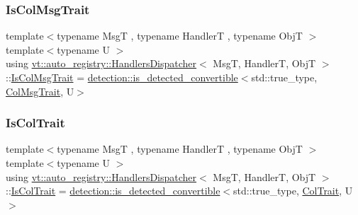 \mbox{\label{structvt_1_1auto__registry_1_1_handlers_dispatcher_a585421b015b2d94915817c509e38b073}} 
\subsubsection{\texorpdfstring{Is\+Col\+Msg\+Trait}{IsColMsgTrait}}
{\footnotesize\ttfamily template$<$typename MsgT , typename HandlerT , typename ObjT $>$ \\
template$<$typename U $>$ \\
using \hyperlink{structvt_1_1auto__registry_1_1_handlers_dispatcher}{vt\+::auto\+\_\+registry\+::\+Handlers\+Dispatcher}$<$ MsgT, HandlerT, ObjT $>$\+::\hyperlink{structvt_1_1auto__registry_1_1_handlers_dispatcher_a585421b015b2d94915817c509e38b073}{Is\+Col\+Msg\+Trait} =  \hyperlink{namespacedetection_afb970b23e39cfecb33449d40242c49ff}{detection\+::is\+\_\+detected\+\_\+convertible}$<$std\+::true\+\_\+type, \hyperlink{structvt_1_1auto__registry_1_1_handlers_dispatcher_aa2e8b80baa4dffdd9b2476ca9d2a7b46}{Col\+Msg\+Trait}, U$>$}

\mbox{\label{structvt_1_1auto__registry_1_1_handlers_dispatcher_aa5e51c30b4d5124a98d04bdc2be043ac}} 
\subsubsection{\texorpdfstring{Is\+Col\+Trait}{IsColTrait}}
{\footnotesize\ttfamily template$<$typename MsgT , typename HandlerT , typename ObjT $>$ \\
template$<$typename U $>$ \\
using \hyperlink{structvt_1_1auto__registry_1_1_handlers_dispatcher}{vt\+::auto\+\_\+registry\+::\+Handlers\+Dispatcher}$<$ MsgT, HandlerT, ObjT $>$\+::\hyperlink{structvt_1_1auto__registry_1_1_handlers_dispatcher_aa5e51c30b4d5124a98d04bdc2be043ac}{Is\+Col\+Trait} =  \hyperlink{namespacedetection_afb970b23e39cfecb33449d40242c49ff}{detection\+::is\+\_\+detected\+\_\+convertible}$<$std\+::true\+\_\+type, \hyperlink{structvt_1_1auto__registry_1_1_handlers_dispatcher_a0d707c7f0650f1185b5628aa71a98c87}{Col\+Trait}, U$>$}



